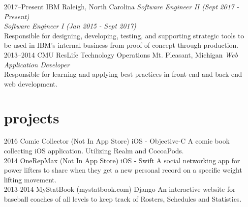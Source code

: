 \documentclass[]{friggeri-cv} %
\begin{document}
\begin{entrylist}
\entry
{2017--Present}
{IBM}
{Raleigh, North Carolina}
{\emph{Software Engineer II (Sept 2017 - Present)} \\
\emph{Software Engineer I (Jan 2015 - Sept 2017)} \\
Responsible for designing, developing, testing, and supporting strategic tools to be used in IBM's internal business from proof of concept through production.}\\

\entry
{2013--2014}
{CMU ResLife Technology Operations}
{Mt. Pleasant, Michigan}
{\emph{Web Application Developer} \\
Responsible for learning and applying best practices in front-end and back-end web development.}\\

\end{entrylist}


\section{projects}

\begin{entrylist}
\entry
{2016}
{Comic Collector (Not In App Store)}
{iOS - Objective-C}
{A comic book collecting iOS application. Utilizing Realm and CocoaPods.}\\

\entry
{2014}
{OneRepMax (Not In App Store)}
{iOS - Swift}
{A social networking app for power lifters to share when they get a new personal record on a specific weight lifting movement.}\\

\entry
{2013-2014}
{MyStatBook (mystatbook.com)}
{Django}
{An interactive website for baseball coaches of all levels to keep track of Rosters, Schedules and Statistics.}\\

\end{entrylist}

\end{document}
